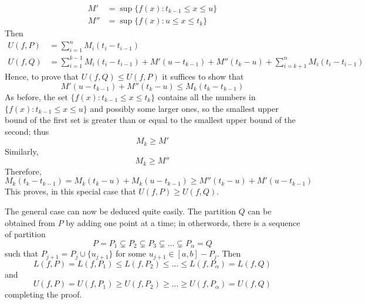 \documentclass[12pt]{report}
\begin{document}
\begin{proof*}{}{}
\begin{align*}
        M' &= \sup\{f(x):t_{k-1} \leq x \leq u\} \\
        M'' &= \sup\{f(x):u \leq x \leq t_k\}
    \end{align*}
    Then \begin{align*}
        U(f,P) &= \sum\limits_{i=1}^nM_i(t_i - t_{i-1}) \\
        U(f,Q) &= \sum\limits_{i=1}^{k-1}M_i(t_i - t_{i-1}) + M'(u-t_{k-1}) + M''(t_k-u) + \sum\limits_{i=k+1}^nM_i(t_i - t_{i-1})
    \end{align*}
    Hence, to prove that $U(f,Q) \leq U(f,P)$ it suffices to show that \begin{equation*}
        M'(u-t_{k-1}) + M''(t_k - u) \leq M_k(t_k-t_{k-1})
    \end{equation*}
    As before, the set $\{f(x):t_{k-1}\leq x \leq t_k\}$ contains all the numbers in $\{f(x):t_{k-1}\leq x \leq u\}$ and possibly some          larger ones, so the smallest upper bound of the first set is greater than or equal to the smallest upper bound of the second; thus          \begin{equation*}
        M_k \geq M'
    \end{equation*}
    Similarly, \begin{equation*}
        M_k \geq M''
    \end{equation*}
    Therefore, \begin{equation*}
        M_k(t_k-t_{k-1}) = M_k(t_k - u) + M_k(u-t_{k-1}) \geq M''(t_k-u) + M'(u-t_{k-1})
    \end{equation*}
    This proves, in this special case that $U(f,P) \geq U(f,Q)$.


    The general case can now be deduced quite easily. The partition $Q$ can be obtained from $P$ by adding one point at a time; in otherwords, there is a sequence of partition \begin{equation*}
        P = P_1\subsetneq P_2 \subsetneq P_3 \subsetneq ... \subsetneq P_{\alpha} = Q
    \end{equation*}
    such that $P_{j+1} = P_j\cup\{u_{j+1}\}$ for some $u_{j+1} \in [a,b]-P_j$. Then \begin{equation*}
        L(f,P) = L(f,P_1) \leq L(f,P_2) \leq ... \leq L(f,P_{\alpha}) = L(f,Q)
    \end{equation*}
    and \begin{equation*}
        U(f,P) = U(f,P_1) \geq U(f,P_2) \geq ... \geq U(f,P_{\alpha}) = U(f,Q)
    \end{equation*}
    completing the proof.
\end{proof*}
\end{document}
